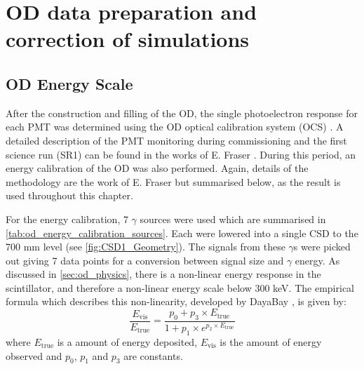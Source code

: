\section{OD data preparation and correction of simulations}

\subsection{OD Energy Scale} \label{sec:od_energy_scale}
\par
After the construction and filling of the OD, the single photoelectron response for each PMT was determined using the OD optical calibration system (OCS) \cite{lz_ocs_system_ref}.
A detailed description of the PMT monitoring during commissioning and the first science run (SR1) can be found in the works of E. Fraser \cite{ewanfraser_thesis_ref}. 
During this period, an energy calibration of the OD was also performed.
Again, details of the methodology are the work of E. Fraser \cite{ewanfraser_thesis_ref} but summarised below, as the result is used throughout this chapter.
\par
For the energy calibration, 7 $\gamma$ sources were used which are summarised in \autoref{tab:od_energy_calibration_sources}.
Each were lowered into a single CSD to the 700 mm level (see \autoref{fig:CSD1_Geometry}).
The signals from these $\gamma$s were picked out giving 7 data points for a conversion between signal size and $\gamma$ energy.
As discussed in \autoref{sec:od_physics}, there is a non-linear energy response in the scintillator, and therefore a non-linear energy scale below 300 keV.
The empirical formula which describes this non-linearity, developed by DayaBay \cite{dayabay_antineutrino_oscillation_ref, ls_nonlinear_energy_response_ref}, is given by:
\begin{equation}
    \frac{E_{\text{vis}}}{E_{\text{true}}} = \frac{p_0  + p_3 \times E_{\text{true}}}{1 + p_1 \times e^{p_2 \times E_{\text{true}}}}
    \label{eq:ls_light_response}
\end{equation}
where $E_{\text{true}}$ is a amount of energy deposited, $E_{\text{vis}}$ is the amount of energy observed and $p_0$, $p_1$ and $p_3$ are constants.

